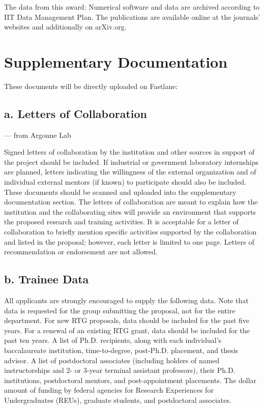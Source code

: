 \documentclass[11pt]{article}
\begin{document}
The     data   from this award: Numerical software and data are archived according to IIT Data Management Plan. The publications are available online at the journals' websites and additionally on arXiv.org.






\section{Supplementary Documentation}

These documents will be directly uploaded on Fastlane:

\subsection{a. Letters of Collaboration}

--- from Argonne Lab


Signed letters of collaboration by the institution and other sources in support of the project should be included. If industrial or government laboratory internships are planned, letters indicating the willingness of the external organization and of individual external mentors (if known) to participate should also be included. These documents should be scanned and uploaded into the supplementary documentation section.
The letters of collaboration are meant to explain how the institution and the collaborating sites will provide an environment that supports the proposed research and training activities. It is acceptable for a letter of collaboration to briefly mention specific activities supported by the collaboration and listed in the proposal; however, each letter is limited to one page. Letters of recommendation or endorsement are not allowed.

\subsection{b. Trainee Data} 

All applicants are strongly encouraged to supply the following data. Note that data is requested for the group submitting the proposal, not for the entire department. For new RTG proposals, data should be included for the past five years. For a renewal of an existing RTG grant, data should be included for the past ten years.
A list of Ph.D. recipients, along with each individual's baccalaureate institution, time-to-degree, post-Ph.D. placement, and thesis advisor.
A list of postdoctoral associates (including holders of named instructorships and 2- or 3-year terminal assistant professors), their Ph.D. institutions, postdoctoral mentors, and post-appointment placements.
The dollar amount of funding by federal agencies for Research Experiences for Undergraduates (REUs), graduate students, and postdoctoral associates.
\end{document}
